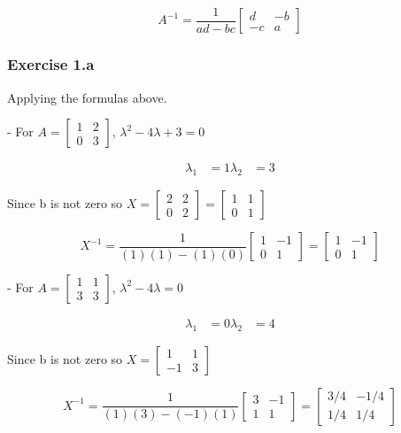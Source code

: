 \documentclass{article}
\begin{document}
\[
    A^{-1} = \frac{1}{ad - bc} \begin{bmatrix} d & -b \\ -c & a \end{bmatrix}
\]

\subsubsection{Exercise 1.a}
Applying the formulas above.

- For \( A = \begin{bmatrix} 1 & 2 \\ 0 & 3 \end{bmatrix} \), \( \lambda^2 - 4\lambda + 3 = 0 \)

\[
    \begin{aligned}
        \lambda_1 & = 1
        \lambda_2 & = 3
    \end{aligned}
\]

Since b is not zero so \( X = \begin{bmatrix} 2 & 2 \\ 0 & 2 \end{bmatrix} = \begin{bmatrix} 1 & 1 \\ 0 & 1 \end{bmatrix} \)

\[
    X^{-1} = \frac{1}{(1)(1) - (1)(0)} \begin{bmatrix} 1 & -1 \\ 0 & 1 \end{bmatrix} = \begin{bmatrix} 1 & -1 \\ 0 & 1 \end{bmatrix}
\]

- For \( A = \begin{bmatrix} 1 & 1 \\ 3 & 3 \end{bmatrix} \), \( \lambda^2 - 4\lambda = 0 \)

\[
    \begin{aligned}
        \lambda_1 & = 0
        \lambda_2 & = 4
    \end{aligned}
\]

Since b is not zero so \( X = \begin{bmatrix} 1 & 1 \\ -1 & 3 \end{bmatrix} \)

\[
    X^{-1} = \frac{1}{(1)(3) - (-1)(1)} \begin{bmatrix} 3 & -1 \\ 1 & 1 \end{bmatrix} = \begin{bmatrix} 3/4 & -1/4 \\ 1/4 & 1/4 \end{bmatrix}
\]
\end{document}
